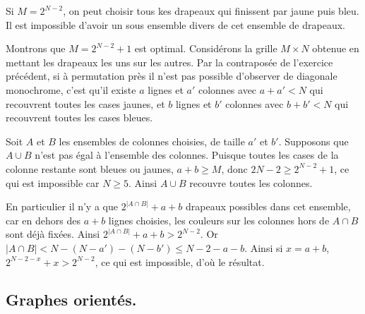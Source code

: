 \begin{sol}
Si $M=2^{N-2}$, on peut choisir tous kes drapeaux qui finissent par jaune puis bleu. Il est impossible d'avoir un sous ensemble divers de cet ensemble de drapeaux.

\medskip

Montrons que $M=2^{N-2}+1$ est optimal. Considérons la grille $M\times N$ obtenue en mettant les drapeaux les uns sur les autres. Par la contraposée de l'exercice précédent, si à permutation près il n'est pas possible d'observer de diagonale monochrome, c'est qu'il existe $a$ lignes et $a'$ colonnes avec $a+a'<N$ qui recouvrent toutes les cases jaunes, et $b$ lignes et $b'$ colonnes avec $b+b'<N$ qui recouvrent toutes les cases bleues.

\medskip


Soit $A$ et $B$ les ensembles de colonnes choisies, de taille $a'$ et $b'$. Supposons que $A\cup B$ n'est pas égal à l'ensemble des colonnes. Puisque toutes les cases de la colonne restante sont bleues ou jaunes, $a+b\geq M$, donc $2N-2\geq 2^{N-2}+1$, ce qui est impossible car $N\geq 5$. Ainsi $A\cup B$ recouvre toutes les colonnes. 

\medskip

En particulier il n'y a que $2^{|A \cap B|}+a+b$ drapeaux possibles dans cet ensemble, car en dehors des $a+b$ lignes choisies, les couleurs sur les colonnes hors de $A\cap B$ sont déjà fixées. Ainsi $2^{|A \cap B|}+a+b> 2^{N-2}$. Or $|A\cap B|<N-(N-a')-(N-b')\leq N-2-a-b$. Ainsi si $x=a+b$, $2^{N-2-x}+x> 2^{N-2}$, ce qui est impossible, d'où le résultat.

\end{sol}

%

\subsection*{Graphes orientés.}


